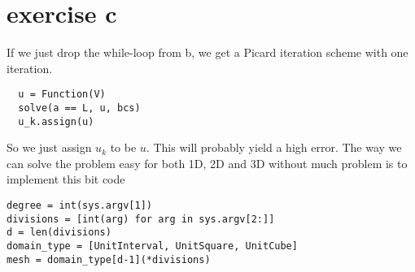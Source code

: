 \section{exercise c}

If we just drop the while-loop from b, we get a Picard iteration scheme with one iteration. 
\begin{lstlisting}
  u = Function(V)
  solve(a == L, u, bcs)
  u_k.assign(u)
\end{lstlisting}

So we just assign $u_k$ to be $u$. This will probably yield a high error.
The way we can solve the problem easy for both 1D, 2D and 3D without much problem is to 
implement this bit code

\begin{lstlisting}
degree = int(sys.argv[1])
divisions = [int(arg) for arg in sys.argv[2:]]
d = len(divisions)
domain_type = [UnitInterval, UnitSquare, UnitCube]
mesh = domain_type[d-1](*divisions)
\end{lstlisting}